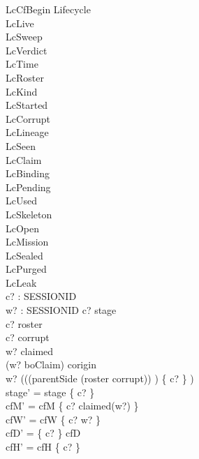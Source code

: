 \documentclass[a4paper,10pt,fleqn]{article}
\begin{document}
\begin{schema}{LcCfBegin}
\Delta Lifecycle \\
\Xi LcLive \\
\Xi LcSweep \\
\Xi LcVerdict \\
\Xi LcTime \\
\Xi LcRoster \\
\Xi LcKind \\
\Xi LcStarted \\
\Xi LcCorrupt \\
\Xi LcLineage \\
\Xi LcSeen \\
\Xi LcClaim \\
\Xi LcBinding \\
\Xi LcPending \\
\Xi LcUsed \\
\Xi LcSkeleton \\
\Xi LcOpen \\
\Xi LcMission \\
\Xi LcSealed \\
\Xi LcPurged \\
\Xi LcLeak \\
c? : SESSIONID \\
w? : SESSIONID
\where
c? \notin \dom stage \\
c? \in roster \\
c? \notin corrupt \\
w? \in \dom claimed \\
(w? \mapsto boClaim) \in corigin \\
w? \in (((parentSide \rres (roster \setminus corrupt)) \plus) \limg \{ c? \} \rimg) \\
stage' = stage \oplus \{ c?  \} \\
cfM' = cfM \oplus \{ c? \mapsto claimed(w?) \} \\
cfW' = cfW \oplus \{ c? \mapsto w? \} \\
cfD' = \{ c? \} \ndres cfD \\
cfH' = cfH \setminus \{ c? \}
\end{schema}
\end{document}
